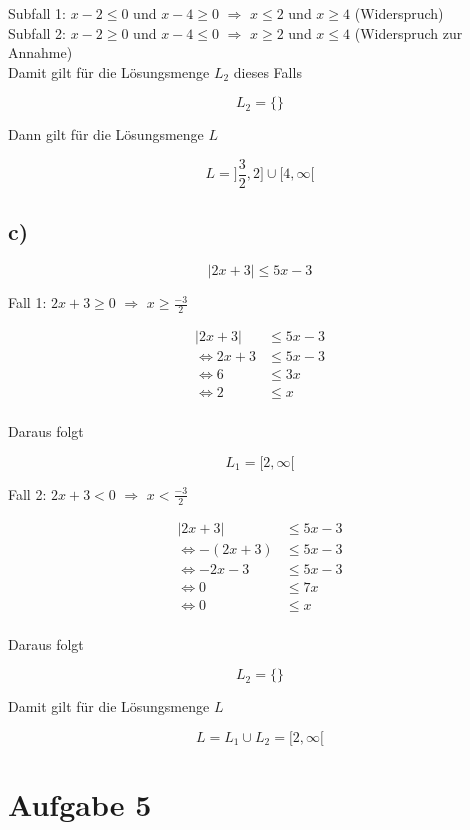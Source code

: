 \documentclass[a4paper, 11pt]{article}
\begin{document}
Subfall 1:  \(x - 2 \leq 0\) und \(x - 4 \geq 0\) \(\Rightarrow\) \(x \leq 2\) und \(x \geq 4\) (Widerspruch) \\
Subfall 2:  \(x - 2 \geq 0\) und \(x - 4 \leq 0\) \(\Rightarrow\) \(x \geq 2\) und \(x \leq 4\) (Widerspruch zur Annahme) \\

Damit gilt für die Lösungsmenge \(L_2\) dieses Falls

$$ L_2 = \{\} $$

Dann gilt für die Lösungsmenge \(L\)

$$ L = ]\frac{3}{2}, 2] \cup [4, \infty[ $$

\subsection{c)}
\label{sec:orgfa86404}
$$ |2x + 3| \leq 5x - 3 $$

Fall 1: \(2x + 3 \geq 0\) \(\Rightarrow\) \(x \geq \frac{-3}{2}\)

\begin{align*}
    |2x + 3| &\leq 5x - 3 \\
    \Leftrightarrow 2x + 3 &\leq 5x - 3 \\
    \Leftrightarrow 6 &\leq 3x \\
    \Leftrightarrow 2 &\leq x \\
\end{align*}

Daraus folgt

$$ L_1 = [2, \infty[ $$

Fall 2:  \(2x + 3 < 0\) \(\Rightarrow\) \(x < \frac{-3}{2}\)

\begin{align*}
    |2x + 3| &\leq 5x - 3 \\
    \Leftrightarrow -(2x + 3) &\leq 5x - 3 \\
    \Leftrightarrow -2x - 3 &\leq 5x - 3 \\
    \Leftrightarrow 0 &\leq 7x \\
    \Leftrightarrow 0 &\leq x \\
\end{align*}

Daraus folgt

$$ L_2 = \{\} $$

Damit gilt für die Lösungsmenge \(L\)

$$ L = L_1 \cup L_2 = [2, \infty[ $$

\section{Aufgabe 5}
\label{sec:org1559469}
\end{document}
